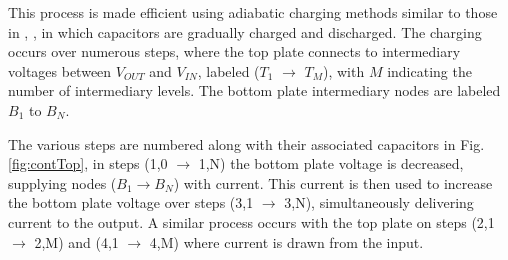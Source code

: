 \documentclass[conference]{IEEEtran}
\begin{document}
	This process is made efficient using adiabatic charging methods similar to those in \cite{svensson1994}, \cite{Butzen2016}, in which capacitors are gradually charged and discharged. The charging occurs over numerous steps, where the top plate connects to intermediary voltages between $V_{OUT}$ and $V_{IN}$, labeled ($T_1$ $\rightarrow$ $T_M$), with $M$ indicating the number of intermediary levels. The bottom plate intermediary nodes are labeled $B_1$ to $B_N$.
	
	The various steps are numbered along with their associated capacitors in Fig. \ref{fig:contTop}, in steps (1,0 $\rightarrow$ 1,N) the bottom plate voltage is decreased, supplying nodes ($B_1 \rightarrow B_N$) with current. This current is then used to increase the bottom plate voltage over steps (3,1 $\rightarrow$ 3,N), simultaneously delivering current to the output. A similar process occurs with the top plate on steps (2,1 $\rightarrow$ 2,M) and (4,1 $\rightarrow$ 4,M) where current is drawn from the input.
	
\end{document}
